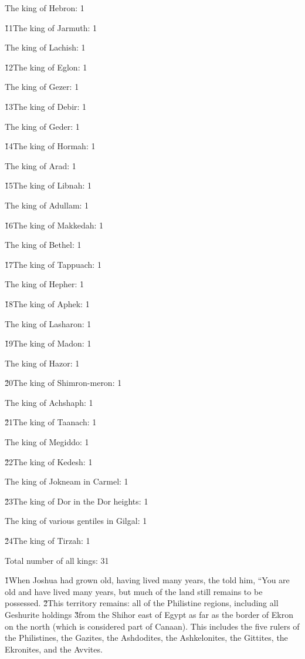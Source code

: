 The king of Hebron: 1

\v{11}The king of Jarmuth: 1

The king of Lachish: 1

\v{12}The king of Eglon: 1

The king of Gezer: 1

\v{13}The king of Debir: 1

The king of Geder: 1

\v{14}The king of Hormah: 1

The king of Arad: 1

\v{15}The king of Libnah: 1

The king of Adullam: 1

\v{16}The king of Makkedah: 1

The king of Bethel: 1

\v{17}The king of Tappuach: 1

The king of Hepher: 1

\v{18}The king of Aphek: 1

The king of Lasharon: 1

\v{19}The king of Madon: 1

The king of Hazor: 1

\v{20}The king of Shimron-meron: 1

The king of Achshaph: 1

\v{21}The king of Taanach: 1

The king of Megiddo: 1

\v{22}The king of Kedesh: 1

The king of Jokneam in Carmel: 1

\v{23}The king of Dor in the Dor heights: 1

The king of various gentiles in Gilgal: 1

\v{24}The king of Tirzah: 1

Total number of all kings: 31

\v{1}When Joshua had grown old, having lived many years, the  told him, ``You are old and have lived many years, but much of the land still remains to be possessed. \v{2}This territory remains: all of the Philistine regions, including all Geshurite holdings \v{3}from the Shihor east of Egypt as far as the border of Ekron on the north (which is considered part of Canaan). This includes the five rulers of the Philistines, the Gazites, the Ashdodites, the Ashkelonites, the Gittites, the Ekronites, and the Avvites.

